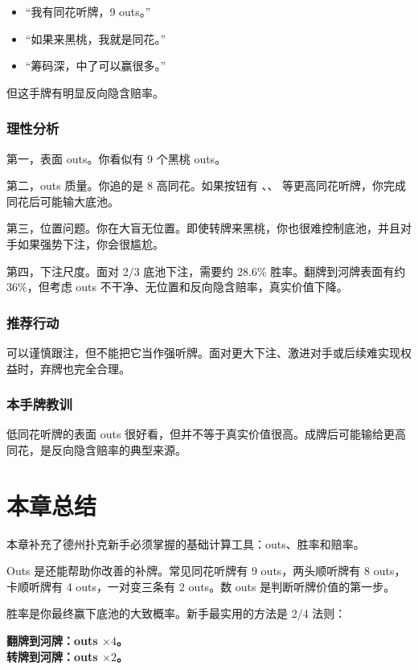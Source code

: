 \begin{itemize}
\item “我有同花听牌，9 outs。”
\item “如果来黑桃，我就是同花。”
\item “筹码深，中了可以赢很多。”
\end{itemize}

但这手牌有明显反向隐含赔率。

\subsubsection*{理性分析}

第一，表面 outs。你看似有 9 个黑桃 outs。

第二，outs 质量。你追的是 8 高同花。如果按钮有 、、 等更高同花听牌，你完成同花后可能输大底池。

第三，位置问题。你在大盲无位置。即使转牌来黑桃，你也很难控制底池，并且对手如果强势下注，你会很尴尬。

第四，下注尺度。面对 2/3 底池下注，需要约 28.6\% 胜率。翻牌到河牌表面有约 36\%，但考虑 outs 不干净、无位置和反向隐含赔率，真实价值下降。

\subsubsection*{推荐行动}

可以谨慎跟注，但不能把它当作强听牌。面对更大下注、激进对手或后续难实现权益时，弃牌也完全合理。

\subsubsection*{本手牌教训}

低同花听牌的表面 outs 很好看，但并不等于真实价值很高。成牌后可能输给更高同花，是反向隐含赔率的典型来源。

\section{本章总结}

本章补充了德州扑克新手必须掌握的基础计算工具：outs、胜率和赔率。

Outs 是还能帮助你改善的补牌。常见同花听牌有 9 outs，两头顺听牌有 8 outs，卡顺听牌有 4 outs，一对变三条有 2 outs。数 outs 是判断听牌价值的第一步。

胜率是你最终赢下底池的大致概率。新手最实用的方法是 2/4 法则：

\begin{center}
\textbf{翻牌到河牌：outs $\times 4$。\\
转牌到河牌：outs $\times 2$。}
\end{center}

